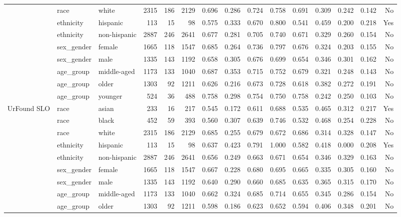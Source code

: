\begin{longtable}{@{}lllrrrrrrrrrrrr@{}}
 & race & white & 2315 & 186 & 2129 & 0.696 & 0.286 & 0.724 & 0.758 & 0.691 & 0.309 & 0.242 & 0.142 & No \\
 & ethnicity & hispanic & 113 & 15 & 98 & 0.575 & 0.333 & 0.670 & 0.800 & 0.541 & 0.459 & 0.200 & 0.218 & Yes \\
 & ethnicity & non-hispanic & 2887 & 246 & 2641 & 0.677 & 0.281 & 0.705 & 0.740 & 0.671 & 0.329 & 0.260 & 0.154 & No \\
 & sex\_gender & female & 1665 & 118 & 1547 & 0.685 & 0.264 & 0.736 & 0.797 & 0.676 & 0.324 & 0.203 & 0.155 & No \\
 & sex\_gender & male & 1335 & 143 & 1192 & 0.658 & 0.305 & 0.676 & 0.699 & 0.654 & 0.346 & 0.301 & 0.162 & No \\
 & age\_group & middle-aged & 1173 & 133 & 1040 & 0.687 & 0.353 & 0.715 & 0.752 & 0.679 & 0.321 & 0.248 & 0.143 & No \\
 & age\_group & older & 1303 & 92 & 1211 & 0.626 & 0.216 & 0.673 & 0.728 & 0.618 & 0.382 & 0.272 & 0.191 & No \\
 & age\_group & younger & 524 & 36 & 488 & 0.758 & 0.298 & 0.754 & 0.750 & 0.758 & 0.242 & 0.250 & 0.103 & No \\
UrFound SLO & race & asian & 233 & 16 & 217 & 0.545 & 0.172 & 0.611 & 0.688 & 0.535 & 0.465 & 0.312 & 0.217 & Yes \\
 & race & black & 452 & 59 & 393 & 0.560 & 0.307 & 0.639 & 0.746 & 0.532 & 0.468 & 0.254 & 0.228 & No \\
 & race & white & 2315 & 186 & 2129 & 0.685 & 0.255 & 0.679 & 0.672 & 0.686 & 0.314 & 0.328 & 0.147 & No \\
 & ethnicity & hispanic & 113 & 15 & 98 & 0.637 & 0.423 & 0.791 & 1.000 & 0.582 & 0.418 & 0.000 & 0.208 & Yes \\
 & ethnicity & non-hispanic & 2887 & 246 & 2641 & 0.656 & 0.249 & 0.663 & 0.671 & 0.654 & 0.346 & 0.329 & 0.163 & No \\
 & sex\_gender & female & 1665 & 118 & 1547 & 0.667 & 0.228 & 0.680 & 0.695 & 0.665 & 0.335 & 0.305 & 0.160 & No \\
 & sex\_gender & male & 1335 & 143 & 1192 & 0.640 & 0.290 & 0.660 & 0.685 & 0.635 & 0.365 & 0.315 & 0.170 & No \\
 & age\_group & middle-aged & 1173 & 133 & 1040 & 0.662 & 0.324 & 0.685 & 0.714 & 0.655 & 0.345 & 0.286 & 0.154 & No \\
 & age\_group & older & 1303 & 92 & 1211 & 0.598 & 0.186 & 0.623 & 0.652 & 0.594 & 0.406 & 0.348 & 0.201 & No \\

\end{longtable}
